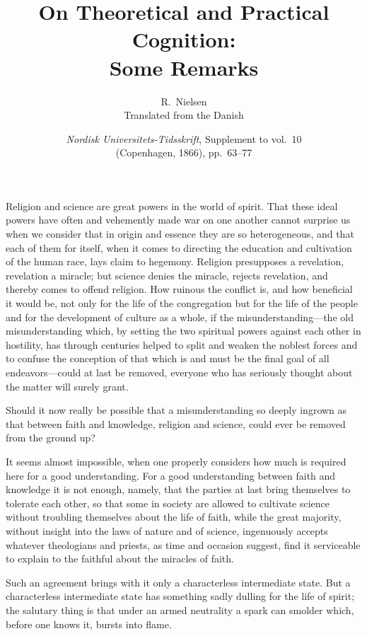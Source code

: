 \documentclass[12pt,a4paper]{article}
\title{\textbf{On Theoretical and Practical Cognition:\\[4pt]
       Some Remarks}}
\author{R.\ Nielsen\\[4pt]
  \small Translated from the Danish}
\date{\emph{Nordisk Universitets-Tidsskrift}, Supplement to vol.~10\\
  (Copenhagen, 1866), pp.\ 63--77}
\newcommand{\opage}[1]{\marginnote{\footnotesize\textit{[#1]}}}
\begin{document}
\maketitle
\thispagestyle{fancy}

\bigskip

\opage{63}Religion and science are great powers in the world of
spirit. That these ideal powers have often and vehemently made war on
one another cannot surprise us when we consider that in origin and
essence they are so heterogeneous, and that each of them for itself,
when it comes to directing the education and cultivation of the human
race, lays claim to hegemony. Religion presupposes a revelation,
revelation a miracle; but science denies the miracle, rejects
revelation, and thereby comes to offend religion. How ruinous the
conflict is, and how beneficial it would be, not only for the life of
the congregation but for the life of the people and for the
development of culture as a whole, if the misunderstanding---the old
misunderstanding which, by setting the two spiritual powers against
each other in hostility, has through centuries helped to split and
weaken the noblest forces and to confuse the conception of that which
is and must be the final goal of all endeavors---could at last be
removed, everyone who has seriously thought about the matter will
surely grant.

Should it now really be possible that a misunderstanding so deeply
ingrown as that between faith and knowledge,
\opage{64}religion and science, could ever be removed from the ground
up?

It seems almost impossible, when one properly considers how much is
required here for a good understanding. For a good understanding
between faith and knowledge it is not enough, namely, that the parties
at last bring themselves to tolerate each other, so that some in
society are allowed to cultivate science without troubling themselves
about the life of faith, while the great majority, without insight
into the laws of nature and of science, ingenuously accepts whatever
theologians and priests, as time and occasion suggest, find it
serviceable to explain to the faithful about the miracles of faith.

Such an agreement brings with it only a characterless intermediate
state. But a characterless intermediate state has something sadly
dulling for the life of spirit; the salutary thing is that under an
armed neutrality a spark can smolder which, before one knows it,
bursts into flame.
\end{document}
